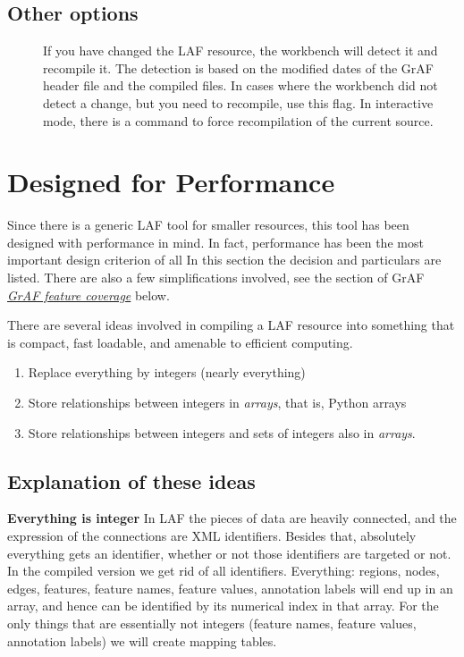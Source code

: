 \documentclass[letterpaper,10pt,english]{sphinxmanual}
\begin{document}
\subsection{Other options}
\label{workbench:other-options}\begin{description}
\item[{}] \leavevmode
If you have changed the LAF resource, the workbench will detect it and recompile it.
The detection is based on the modified dates of the GrAF header file and the compiled files.
In cases where the workbench did not detect a change, but you need to recompile, use this flag.
In interactive mode, there is a command to force recompilation of the current source.

\end{description}


\section{Designed for Performance}
\label{workbench:designed-for-performance}
Since there is a generic LAF tool for smaller resources, this tool has been designed with performance in mind.
In fact, performance has been the most important design criterion of all
In this section the decision and particulars are listed.
There are also a few simplifications involved, see the section of GrAF {\hyperref[workbench:feature-coverage]{\emph{GrAF feature coverage}}} below.

There are several ideas involved in compiling a LAF resource into something that is compact, fast loadable, and amenable to efficient computing.
\begin{enumerate}
\item {} 
Replace everything by integers (nearly everything)

\item {} 
Store relationships between integers in \emph{arrays}, that is, Python arrays

\item {} 
Store relationships between integers and sets of integers also in \emph{arrays}.

\end{enumerate}


\subsection{Explanation of these ideas}
\label{workbench:explanation-of-these-ideas}
\textbf{Everything is integer}
In LAF the pieces of data are heavily connected, and the expression of the connections are XML identifiers.
Besides that, absolutely everything gets an identifier, whether or not those identifiers are targeted or not.
In the compiled version we get rid of all identifiers.
Everything: regions, nodes, edges, features, feature names, feature values, annotation labels will end up in an array,
and hence can be identified by its numerical index in that array.
For the only things that are essentially not integers (feature names, feature values, annotation labels) we will create mapping tables.
\end{document}
